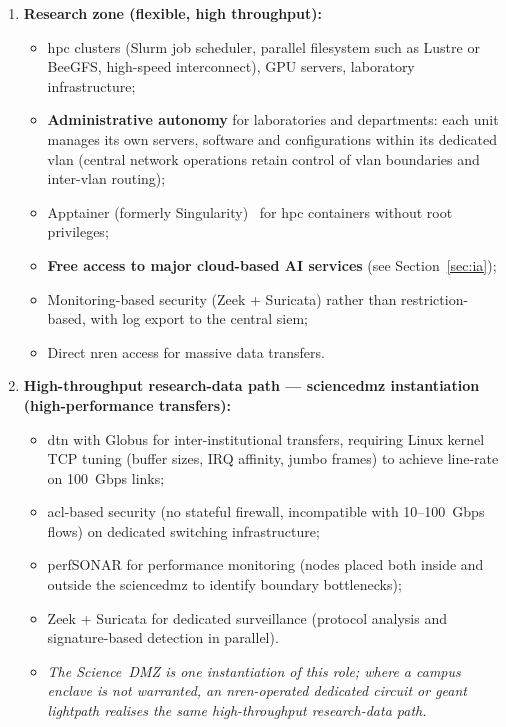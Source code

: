 \begin{enumerate}
    \item \textbf{Research zone (flexible, high throughput):}
    \begin{itemize}[nosep]
        \item \gls{hpc} clusters (Slurm job scheduler, parallel filesystem
        such as Lustre or BeeGFS, high-speed interconnect),
        GPU servers, laboratory infrastructure;
        \item \textbf{Administrative autonomy} for laboratories and
        departments: each unit manages its own servers, software
        and configurations within its dedicated \gls{vlan} (central
        network operations retain control of \gls{vlan} boundaries and
        inter-\gls{vlan} routing);
        \item Apptainer (formerly Singularity)~\cite{singularity} for \gls{hpc}
        containers without root privileges;
        \item \textbf{Free access to major cloud-based AI services}
        (see Section~\ref{sec:ia});
        \item Monitoring-based security (Zeek + Suricata) rather than
        restriction-based, with log export to the central \gls{siem};
        \item Direct \gls{nren} access for massive data transfers.
    \end{itemize}

    \item \textbf{High-throughput research-data path --- \gls{sciencedmz} instantiation (high-performance transfers):}
    \begin{itemize}[nosep]
        \item \gls{dtn} with Globus for inter-institutional transfers,
        requiring Linux kernel TCP tuning (buffer sizes, IRQ affinity,
        jumbo frames) to achieve line-rate on 100~Gbps links;
        \item \gls{acl}-based security (no stateful firewall, incompatible with
        10--100~Gbps flows) on dedicated switching infrastructure;
        \item perfSONAR for performance monitoring (nodes placed both
        inside and outside the \gls{sciencedmz} to identify boundary
        bottlenecks);
        \item Zeek + Suricata for dedicated surveillance (protocol
        analysis and signature-based detection in parallel).
        \item[] \emph{The Science~DMZ is one instantiation of this role;
        where a campus enclave is not warranted, an \gls{nren}-operated
        dedicated circuit or \gls{geant} lightpath realises the same
        high-throughput research-data path.}
    \end{itemize}


\end{enumerate}
